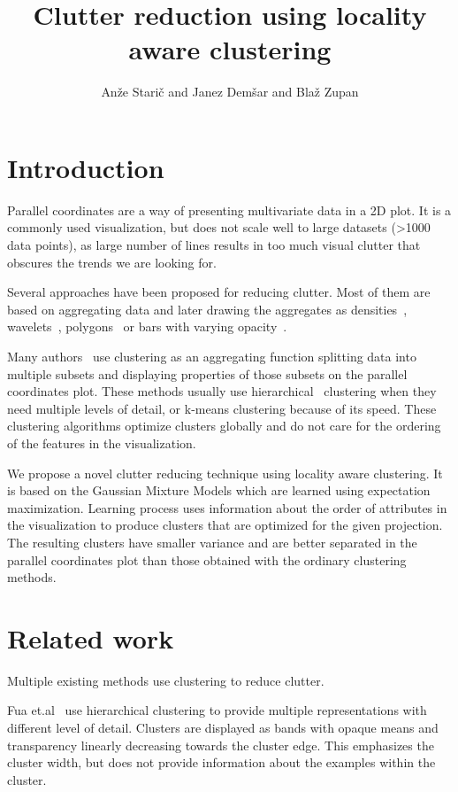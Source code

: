 \documentclass[10pt,a4paper]{article}
\title{Clutter reduction using locality aware clustering}
\author{An\v{z}e Stari\v{c} and Janez Dem\v{s}ar and Bla\v{z} Zupan}
\begin{document}
\maketitle
\section{Introduction}
Parallel coordinates are a way of presenting multivariate data in a 2D plot. It is a commonly used visualization, but does not scale well to large datasets (>1000 data points), as large number of lines results in too much visual clutter that obscures the trends we are looking for.

Several approaches have been proposed for reducing clutter. Most of them are based on aggregating data and later drawing the aggregates as densities~\cite{HW09}, wavelets~\cite{RZH12}, polygons~\cite{AA04, N04} or bars with varying opacity~\cite{BH03,FWR99b}.

Many authors~\cite{FWR99b,JLJC05,N04,AA04} use clustering as an aggregating function splitting data into multiple subsets and displaying properties of those subsets on the parallel coordinates plot. These methods usually use hierarchical~\cite{FWR99b} clustering when they need multiple levels of detail, or k-means clustering because of its speed. These clustering algorithms optimize clusters globally and do not care for the ordering of the features in the visualization.

We propose a novel clutter reducing technique using locality aware clustering. It is based on the Gaussian Mixture Models which are learned using expectation maximization. Learning process uses information about the order of attributes in the visualization to produce clusters that are optimized for the given projection. The resulting clusters have smaller variance and are better separated in the parallel coordinates plot than those obtained with the ordinary clustering methods.

\section{Related work}
Multiple existing methods use clustering to reduce clutter.

Fua et.al~\cite{FWR99b} use hierarchical clustering to provide multiple representations with different level of detail. Clusters are displayed as bands with opaque means and transparency linearly decreasing towards the cluster edge. This emphasizes the cluster width, but does not provide information about the examples within the cluster.
\end{document}
